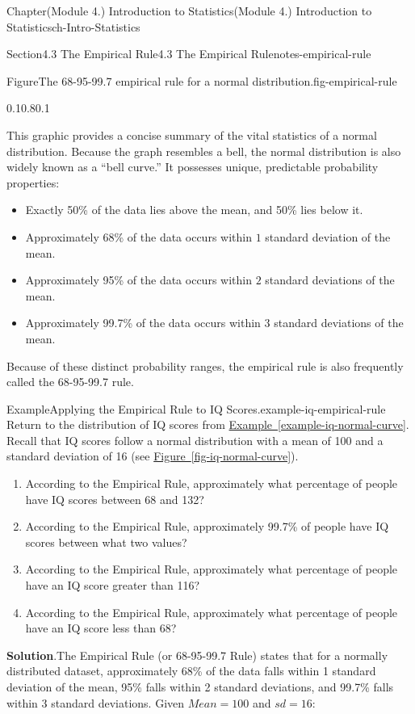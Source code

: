\documentclass[oneside,10pt,]{book}
\newcommand{\blocktitlefont}{\relax}
\newcommand{\xreffont}{\relax}
\newcommand{\ptxlistdisc}{\raisebox{0.3ex}{\textbullet}}
\begin{document}
\begin{chapterptx}{Chapter}{(Module 4.) Introduction to Statistics}{}{(Module 4.) Introduction to Statistics}{}{}{ch-Intro-Statistics}
\begin{sectionptx}{Section}{4.3 The Empirical Rule}{}{4.3 The Empirical Rule}{}{}{notes-empirical-rule}
\begin{figureptx}{Figure}{The 68-95-99.7 empirical rule for a normal distribution.}{fig-empirical-rule}{}
\begin{image}{0.1}{0.8}{0.1}{}
{\begin{tikzpicture}[x=1.2cm, y=10cm]
\end{tikzpicture}%
}%
\end{image}%
\tcblower
\end{figureptx}%
This graphic provides a concise summary of the vital statistics of a normal distribution. Because the graph resembles a bell, the normal distribution is also widely known as a \textquotedblleft{}bell curve.\textquotedblright{} It possesses unique, predictable probability properties:%
%
\begin{itemize}[label=\ptxlistdisc]
\item{}Exactly 50\% of the data lies above the mean, and 50\% lies below it.%
\item{}Approximately 68\% of the data occurs within \(1\) standard deviation of the mean.%
\item{}Approximately 95\% of the data occurs within \(2\) standard deviations of the mean.%
\item{}Approximately 99.7\% of the data occurs within \(3\) standard deviations of the mean.%
\end{itemize}
Because of these distinct probability ranges, the empirical rule is also frequently called the 68-95-99.7 rule.%
\begin{example}{Example}{Applying the Empirical Rule to IQ Scores.}{example-iq-empirical-rule}%
Return to the distribution of IQ scores from \hyperref[example-iq-normal-curve]{Example~{\xreffont\ref{example-iq-normal-curve}}}. Recall that IQ scores follow a normal distribution with a mean of 100 and a standard deviation of 16 (see \hyperref[fig-iq-normal-curve]{Figure~{\xreffont\ref{fig-iq-normal-curve}}}).%
\par
%
\begin{enumerate}[label={\arabic*}]
\item{}According to the Empirical Rule, approximately what percentage of people have IQ scores between 68 and 132?%
\item{}According to the Empirical Rule, approximately 99.7\% of people have IQ scores between what two values?%
\item{}According to the Empirical Rule, approximately what percentage of people have an IQ score greater than 116?%
\item{}According to the Empirical Rule, approximately what percentage of people have an IQ score less than 68?%
\end{enumerate}
%
\par\smallskip%
\noindent\textbf{\blocktitlefont Solution}.\hypertarget{example-iq-empirical-rule-3}{}\quad{}The Empirical Rule (or 68-95-99.7 Rule) states that for a normally distributed dataset, approximately 68\% of the data falls within 1 standard deviation of the mean, 95\% falls within 2 standard deviations, and 99.7\% falls within 3 standard deviations. Given \(Mean = 100\) and \(sd = 16\):%

\end{example}
\end{sectionptx}
\end{chapterptx}
\end{document}

